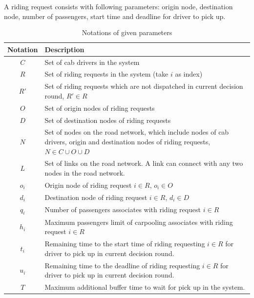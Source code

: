 A riding request consists with following parameters: origin node, destination node, number of passengers, start time and deadline for driver to pick up.

\renewcommand\arraystretch{1.0}
\par
\begin{longtable}{cp{14cm}}
  \caption{Notations of given parameters}\\
  \toprule
  \multicolumn{1}{l}{Notation}&
  \multicolumn{1}{l}{Description}\\
  \midrule
  \endhead
    $C$ & Set of cab drivers in the system \\
    $R$ & Set of riding requests in the system (take $i$ as index) \\
    $R'$ & Set of riding requests which are not dispatched in current decision round, $R' \in R$ \\
    $O$ & Set of origin nodes of riding requests \\
    $D$ & Set of destination nodes of riding requests \\
    $N$ & Set of nodes on the road network, which include nodes of cab drivers, origin and destination nodes of riding requests, $N \in C \cup O \cup D$ \\
    $L$ & Set of links on the road network. A link can connect with any two nodes in the road network. \\
    $o_i$ & Origin node of riding request $i \in R$, $o_i \in O$ \\
    $d_i$ & Destination node of riding request $i \in R$, $d_i \in D$ \\
    $q_i$ & Number of passengers associates with riding request $i \in R$ \\
    $h_i$ & Maximum passengers limit of carpooling associates with riding request $i \in R$ \\
    $t_i$ & Remaining time to the start time of riding requesting $i \in R$ for driver to pick up in current decision round. \\
    $u_i$ & Remaining time to the deadline of riding requesting $i \in R$ for driver to pick up in current decision round. \\
    $T$ & Maximum additional buffer time to wait for pick up in the system. \\

\end{longtable}
